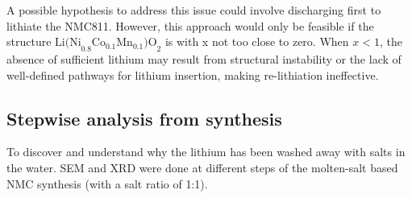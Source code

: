 \documentclass{article}
\begin{document}
A possible hypothesis to address this issue could involve discharging first to lithiate the NMC811. However, this approach
 would only be feasible if the structure \({\text{Li(Ni}}_{0.8}{\text{Co}}_{0.1}{\text{Mn}}_{0.1}{\text{)O}}_{2}\)
 is with x not too close to zero. When \(x<1\), the absence of 
sufficient lithium may result from structural instability or the lack of well-defined pathways for lithium insertion, making
 re-lithiation ineffective. \cite{lithiation}

 \subsection{Stepwise analysis from synthesis}
 To discover and understand why the lithium has been washed away with salts in the water. SEM and XRD were done at different steps of the molten-salt based NMC synthesis (with a salt ratio of 1:1).\\
\end{document}
